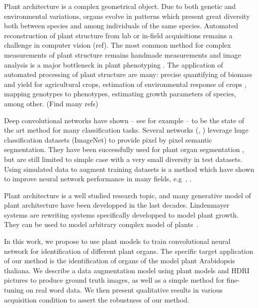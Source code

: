 Plant architecture is a complex geometrical object. Due to both genetic and
environmental variations, organs evolve in patterns which present great diversity
both between species and among individuals of the same species. Automated
reconstruction of plant structure from lab or in-field acquisitions remains a challenge in computer
vision (ref). The most common method for complex measurements of plant structure
remains handmade measurements and image analysis is a major bottleneck in plant phenotyping
\cite{minervini2015image}. The application of automated processing of plant structure are many: precise
quantifying of biomass and yield for agricultural crops, estimation of environmental response
of crops \cite{peirone2018assessing}, mapping genotypes to
phenotypes, estimating growth parameters of species, among other. (Find many
refs)

Deep convolutional networks have shown -- see for example \cite{krizhevsky2012imagenet} --
to be the state of the art method for many classification tasks. Several
networks (\cite{ronneberger2015u}, \cite{long2015fully}) leverage huge classification datasets (ImageNet) to provide pixel by
pixel semantic segmentation. They have been successfully used for plant organ
segmentation \cite{shi2019plant}, but are still limited to simple case with a very
small diversity in test datasets. Using simulated data to augment training
datasets is a method which have shown to improve neural network performance in
many fields, e.g~\cite{qiu2016unrealcv}, \cite{alhaija2018augmented}.

Plant architecture is a well studied research topic, and many generative model
of plant architecture have been developped in the last decades. Lindenmayer
systems are rewriting systems specifically developped to model plant growth.
They can be used to model arbitrary complex model of plants~\cite{boudon_l-py:_2012}.

In this work, we propose to use plant models to train convolutional neural network for
identification of different plant organs. The specific target application of
our method is the identification of organs of the model plant Arabidopsis
thaliana. We describe a data augmentation model using plant models and HDRI
pictures to produce ground truth images, as well as a simple method for
fine-tuning on real word data. We then present qualitative results in various
acquisition condition to assert the robustness of our method.
